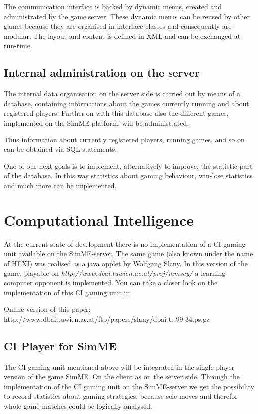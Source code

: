 		The communication interface is backed by dynamic menus, created and
		administrated by the game server. These dynamic menus can be reused by
		other games because they are organised in interface-classes and
		consequently are modular. The layout and content is defined in XML and
		can be exchanged at run-time.

	\subsection{Internal administration on the server}

		The internal data organisation on the server side is carried out by
		means of a database, containing informations about the games currently
		running and about registered players. Further on with this database also
		the different games, implemented on the SimME-platform, will be
		administrated.

		Thus information about currently registered players, running games, and
		so on can be obtained via SQL statements.

		One of our next goals is to implement, alternatively to improve, the
		statistic part of the database. In this way statistics about gaming
		behaviour, win-lose statistics and much more can be implemented.


\section{Computational Intelligence} \label{sec:ci}

	At the current state of development there is no implementation of a CI
	gaming unit available on the SimME-server. The same game (also known under
	the name of HEXI) was realised as a java applet by Wolfgang Slany. In this
	version of the game, playable on
	\textit{http://www.dbai.tuwien.ac.at/proj/ramsey/} a learning computer
	opponent is implemented. You can take a closer look on the implementation of
	this CI gaming unit in \cite{slany_paper}

	\noindent Online version of this paper:\\
	http://www.dbai.tuwien.ac.at/ftp/papers/slany/dbai-tr-99-34.ps.gz

	\subsection{CI Player for SimME}

		The CI gaming unit mentioned above will be integrated in the single
		player version of the game SimME. On the client as on the server side.
		Through the implementation of the CI gaming unit on the SimME-server we
		get the possibility to record statistics about gaming strategies,
		because sole moves and therefor whole game matches could be logically
		analysed.

